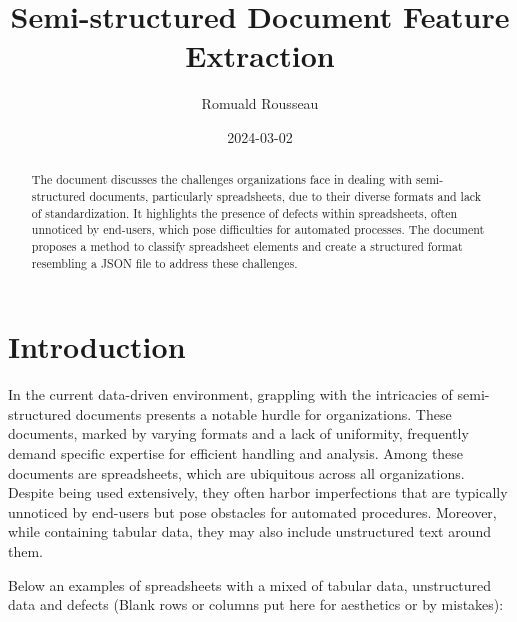 \documentclass{article}
\title{Semi-structured Document Feature Extraction}
\author{Romuald Rousseau}
\date{ 2024-03-02 }
\begin{document}
\maketitle

\begin{abstract}
The document discusses the challenges organizations face in dealing with semi-structured documents, particularly
spreadsheets, due to their diverse formats and lack of standardization. It highlights the presence of defects within
spreadsheets, often unnoticed by end-users, which pose difficulties for automated processes. The document proposes a
method to classify spreadsheet elements and create a structured format resembling a JSON file to address these
challenges.
\end{abstract}

\section{Introduction}
In the current data-driven environment, grappling with the intricacies of semi-structured documents presents a notable
hurdle for organizations. These documents, marked by varying formats and a lack of uniformity, frequently demand
specific expertise for efficient handling and analysis. Among these documents are spreadsheets, which are ubiquitous
across all organizations. Despite being used extensively, they often harbor imperfections that are typically unnoticed
by end-users but pose obstacles for automated procedures. Moreover, while containing tabular data, they may also include
unstructured text around them.

Below an examples of spreadsheets with a mixed of tabular data, unstructured data and defects (Blank rows or columns put
here for aesthetics or by mistakes):
\end{document}
